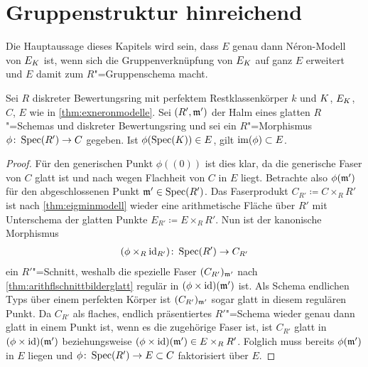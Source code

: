 \section{Gruppenstruktur hinreichend}\label{chap:gruppenstrukturhinreichend}
Die Hauptaussage dieses Kapitels wird sein, dass $E$ genau dann
Néron-Modell von $E_{K}$ ist, wenn sich die Gruppenverknüpfung von
$E_{K}$ auf ganz $E$ erweitert und $E$ damit zum $R$"=Gruppenschema
macht.
\begin{Lemma}\label{thm:schnittearithmflglatt}
  Sei $R$ diskreter Bewertungsring mit perfektem Restklassenkörper
  $k$ und $K$, $E_{K}$, $C$, $E$ wie in \ref{thm:exneronmodelle}.
  Sei $(R',\mathfrak{m}')$ der Halm eines glatten $R$"=Schemas und diskreter
  Bewertungsring
  und sei ein $R$"=Morphismus ${\phi\colon \operatorname{Spec}(R')\to C}$ gegeben.
  Ist ${\phi(\operatorname{Spec}(K))\in E}$, gilt ${\operatorname{im}(\phi)\subset E}$.
  \begin{proof}
    Für den generischen Punkt $\phi((0))$ ist dies klar, da die
    generische Faser von $C$ glatt ist und nach
    \cite[Proposition~8.5/17]{bosch} wegen Flachheit von $C$ in $E$
    liegt. 
    Betrachte also $\phi(\mathfrak{m}')$ für den abgeschlossenen Punkt
    ${\mathfrak{m}'\in\operatorname{Spec}(R')}$.
    Das Faserprodukt ${C_{R'}\coloneqq C\times_R R'}$ ist nach
    \ref{thm:eigminmodell} wieder eine arithmetische Fläche über
    $R'$ mit Unterschema der glatten Punkte
    ${E_{R'}\coloneqq E\times_R R'}$.
    Nun ist der kanonische Morphismus
    \begin{gather*}
      {(\phi\times_{R}\mathrm{id}_{R'})\colon\operatorname{Spec}(R')\to C_{R'}}
    \end{gather*}
    ein $R'$"=Schnitt, weshalb die spezielle Faser $(C_{R'})_{\mathfrak{m}'}$ nach
    \ref{thm:arithflschnittbilderglatt} regulär in
    $(\phi\times\mathrm{id})(\mathfrak{m}')$ ist.
    Als Schema endlichen Typs über einem
    perfekten Körper ist $(C_{R'})_{\mathfrak{m}'}$ sogar glatt in diesem
    regulären Punkt.
    Da $C_{R'}$ als flaches, endlich präsentiertes $R'$"=Schema wieder
    genau dann glatt in einem Punkt ist, wenn es die zugehörige Faser
    ist, ist $C_{R'}$ glatt in $(\phi\times\mathrm{id})(\mathfrak{m}')$ beziehungsweise
    $(\phi\times\mathrm{id})(\mathfrak{m}')\in E\times_R R'$. Folglich muss bereits
    $\phi(\mathfrak{m}')$ in $E$ liegen und $\phi\colon \operatorname{Spec}(R')\to E\subset C$
    faktorisiert über $E$.
  \end{proof}
\end{Lemma}

